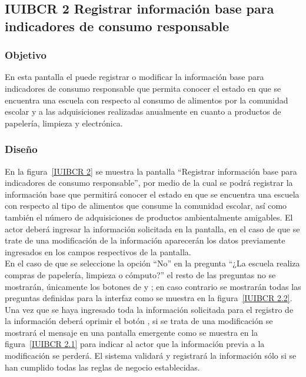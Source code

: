 \subsection{IUIBCR 2 Registrar información base para indicadores de consumo responsable}

\subsubsection{Objetivo}

      En esta pantalla el  puede registrar o modificar la información base para indicadores de consumo responsable que permita conocer el estado en que se encuentra una escuela con respecto al consumo de alimentos por la comunidad escolar y a las adquisiciones realizadas anualmente en cuanto a productos de papelería, limpieza y electrónica.

\subsubsection{Diseño}

    En la figura~\ref{IUIBCR 2} se muestra la pantalla ``Registrar información base para indicadores de consumo responsable'', por medio de la cual se podrá registrar la información base que permitirá conocer el estado en que se encuentra una escuela con respecto al tipo de alimentos que consume la comunidad escolar, así como también el número de adquisiciones de productos ambientalmente amigables. El actor deberá ingresar la información solicitada en la pantalla, en el caso de que se trate de una modificación de la información aparecerán los datos previamente ingresados en los campos respectivos de la pantalla.\\
    
    En el caso de que se seleccione la opción ``No'' en la pregunta ``¿La escuela realiza compras de papelería, limpieza o cómputo?'' el resto de las preguntas no se mostrarán, únicamente los botones de  y ; en caso contrario se mostrarán todas las preguntas definidas para la interfaz como se muestra en la figura~\ref{IUIBCR 2.2}. \\
        
    Una vez que se haya ingresado toda la información solicitada para el registro de la información deberá oprimir el botón , si se trata de una modificación se mostrará el mensaje  en una pantalla emergente como se muestra en la figura~\ref{IUIBCR 2.1} para indicar al actor que la información previa a la modificación se perderá. El sistema validará y registrará la información sólo si se han cumplido todas las reglas de negocio establecidas.\\
    
